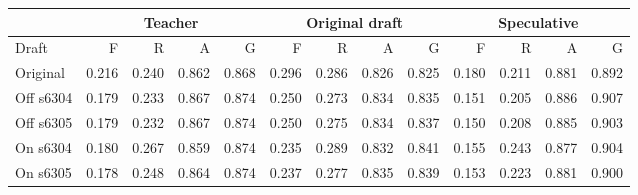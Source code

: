 \scriptsize
\setlength{\tabcolsep}{3.5pt}
\label{tab:t3dist}
\begin{adjustbox}{max width=\linewidth}
\begin{tabular}{lrrrrrrrrrrrr}
\toprule
 & \multicolumn{4}{c}{Teacher} & \multicolumn{4}{c}{Original draft} & \multicolumn{4}{c}{Speculative} \\
\midrule
Draft & F & R & A & G & F & R & A & G & F & R & A & G \\
\midrule
Original & 0.216 & 0.240 & 0.862 & 0.868 & 0.296 & 0.286 & 0.826 & 0.825 & 0.180 & 0.211 & 0.881 & 0.892 \\
Off s6304 & 0.179 & 0.233 & 0.867 & 0.874 & 0.250 & 0.273 & 0.834 & 0.835 & 0.151 & 0.205 & 0.886 & 0.907 \\
Off s6305 & 0.179 & 0.232 & 0.867 & 0.874 & 0.250 & 0.275 & 0.834 & 0.837 & 0.150 & 0.208 & 0.885 & 0.903 \\
On s6304 & 0.180 & 0.267 & 0.859 & 0.874 & 0.235 & 0.289 & 0.832 & 0.841 & 0.155 & 0.243 & 0.877 & 0.904 \\
On s6305 & 0.178 & 0.248 & 0.864 & 0.874 & 0.237 & 0.277 & 0.835 & 0.839 & 0.153 & 0.223 & 0.881 & 0.900 \\
\bottomrule
\end{tabular}
\end{adjustbox}

